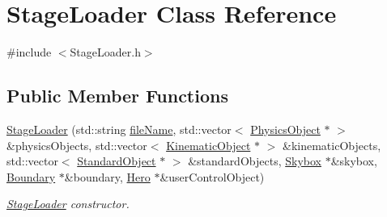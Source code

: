 \hypertarget{class_stage_loader}{}\section{Stage\+Loader Class Reference}
\label{class_stage_loader}


{\ttfamily \#include $<$Stage\+Loader.\+h$>$}

\subsection*{Public Member Functions}
\begin{DoxyCompactItemize}
\item 
\hyperlink{class_stage_loader_ac3db92090726b0394a18345e5a781a9d}{Stage\+Loader} (std\+::string \hyperlink{class_stage_loader_a3574f9ea01596806f37b196849bbefae}{file\+Name}, std\+::vector$<$ \hyperlink{class_physics_object}{Physics\+Object} $\ast$ $>$ \&physics\+Objects, std\+::vector$<$ \hyperlink{class_kinematic_object}{Kinematic\+Object} $\ast$ $>$ \&kinematic\+Objects, std\+::vector$<$ \hyperlink{class_standard_object}{Standard\+Object} $\ast$ $>$ \&standard\+Objects, \hyperlink{class_skybox}{Skybox} $\ast$\&skybox, \hyperlink{class_boundary}{Boundary} $\ast$\&boundary, \hyperlink{class_hero}{Hero} $\ast$\&user\+Control\+Object)
\begin{DoxyCompactList}\small\item\em \hyperlink{class_stage_loader}{Stage\+Loader} constructor. \end{DoxyCompactList}\end{DoxyCompactItemize}
